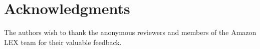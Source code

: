 \section*{Acknowledgments}

The authors wish to thank the anonymous reviewers and members of the
Amazon LEX team for their valuable feedback.

